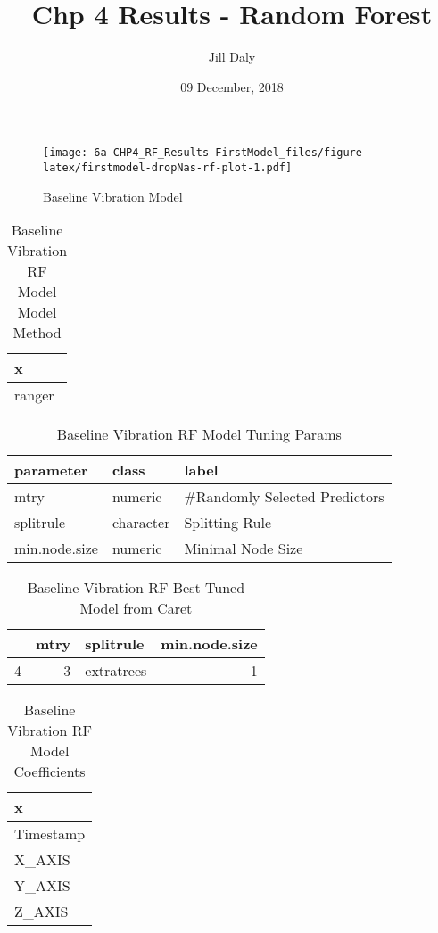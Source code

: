 \documentclass[]{article}
\title{Chp 4 Results - Random Forest}
\author{Jill Daly}
\date{09 December, 2018}
\begin{document}
\maketitle

\begin{figure}
\centering
\texttt{[image: 6a-CHP4\_RF\_Results-FirstModel\_files/figure-latex/firstmodel-dropNas-rf-plot-1.pdf]}
\caption{Baseline Vibration Model}
\end{figure}

\begin{table}[!h]

\caption{\label{tab:baseline-rf-params}Baseline Vibration RF Model Model Method}
\centering
\begin{tabular}[t]{l}
\toprule
x\\
\midrule
ranger\\
\bottomrule
\end{tabular}
\end{table}

\begin{table}[!h]

\caption{\label{tab:baseline-rf-params}Baseline Vibration RF Model Tuning Params}
\centering
\begin{tabular}[t]{lll}
\toprule
parameter & class & label\\
\midrule
mtry & numeric & \#Randomly Selected Predictors\\
splitrule & character & Splitting Rule\\
min.node.size & numeric & Minimal Node Size\\
\bottomrule
\end{tabular}
\end{table}

\begin{table}[!h]

\caption{\label{tab:baseline-rf-params}Baseline Vibration RF Best Tuned Model from Caret}
\centering
\begin{tabular}[t]{lrlr}
\toprule
  & mtry & splitrule & min.node.size\\
\midrule
4 & 3 & extratrees & 1\\
\bottomrule
\end{tabular}
\end{table}

\begin{table}[!h]

\caption{\label{tab:baseline-rf-params}Baseline Vibration RF Model Coefficients}
\centering
\begin{tabular}[t]{l}
\toprule
x\\
\midrule
Timestamp\\
X\_AXIS\\
Y\_AXIS\\
Z\_AXIS\\
\bottomrule
\end{tabular}
\end{table}
\end{document}
